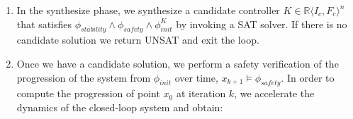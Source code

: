 \documentclass[runningheads,a4paper]{llncs}
\newcommand{\mat}[1]{\boldsymbol{#1}}
\begin{document}
\begin{enumerate}
\begin{enumerate}
\end{enumerate}
\item In the {\sc synthesize} phase, we synthesize a candidate controller
  $K \in \mathbb{R}\langle I_c,F_c\rangle^n$ that satisfies
  $\phi_\mathit{stability} \wedge \phi_\mathit{safety} \wedge \phi_\mathit{init}^{K}$ by invoking a SAT solver.
If there is no candidate solution we return UNSAT and exit the loop.
\item Once we have a candidate solution, we perform a safety verification %
  of the 
  progression of the system from $\phi_\mathit{init}$ over time,
$x_{k+1} \models \phi_\mathit{safety}$. %
  In order to compute the progression of point $x_0$ at iteration $k$,
  we accelerate the dynamics of the closed-loop system and obtain:

\end{enumerate}
\end{document}
